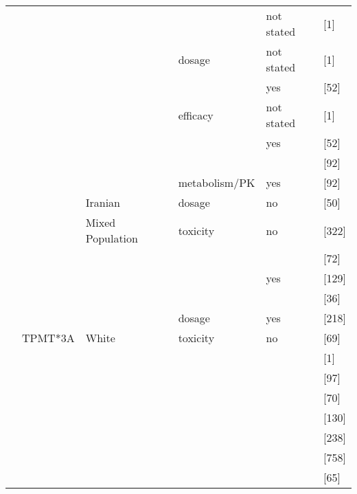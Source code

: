 \begin{center}
\begin{longtable}[H]{|l|l|l|l||l||l|}
\cline{5-6}
& & & & not stated & \citeauthor{pmid12477776} \citeyear{pmid12477776} [1] \\
\cline{4-6}
& & & dosage & not stated & \citeauthor{pmid12477776} \citeyear{pmid12477776} [1] \\
\cline{5-6}
& & & & yes & \citeauthor{Gardiner_2008} \citeyear{Gardiner_2008} [52] \\
\cline{4-6}
& & & efficacy & not stated & \citeauthor{pmid12477776} \citeyear{pmid12477776} [1] \\
\cline{5-6}
& & & & yes & \citeauthor{Gardiner_2008} \citeyear{Gardiner_2008} [52] \\
\cline{6-6}
& & & & & \citeauthor{pmid10734022} \citeyear{pmid10734022} [92] \\
\cline{4-6}
& & & metabolism/PK & yes & \citeauthor{pmid10734022} \citeyear{pmid10734022} [92] \\
\cline{3-6}
& & Iranian & dosage & no & \citeauthor{pmid21819368} \citeyear{pmid21819368} [50] \\
\cline{3-6}
& & Mixed Population & toxicity & no & \citeauthor{Newman_2011} \citeyear{Newman_2011} [322] \\
\cline{6-6}
& & & & & \citeauthor{RIDDER_2006} \citeyear{RIDDER_2006} [72] \\
\cline{5-6}
& & & & yes & \citeauthor{Heckmann_2005} \citeyear{Heckmann_2005} [129] \\
\cline{6-6}
& & & & & \citeauthor{Formea_2004} \citeyear{Formea_2004} [36] \\
\cline{4-6}
& & & dosage & yes & \citeauthor{Fabre_2004} \citeyear{Fabre_2004} [218] \\
\cline{2-6}
& TPMT*3A & White & toxicity & no & \citeauthor{pmid12172211} \citeyear{pmid12172211} [69] \\
\cline{6-6}
& & & & & \citeauthor{Yenson_2007} \citeyear{Yenson_2007} [1] \\
\cline{6-6}
& & & & & \citeauthor{Gazouli_2010} \citeyear{Gazouli_2010} [97] \\
\cline{6-6}
& & & & & \citeauthor{Stocco_2005} \citeyear{Stocco_2005} [70] \\
\cline{6-6}
& & & & & \citeauthor{WINTER_2007} \citeyear{WINTER_2007} [130] \\
\cline{6-6}
& & & & & \citeauthor{Moloney_2006} \citeyear{Moloney_2006} [238] \\
\cline{6-6}
& & & & & \citeauthor{pmid20593505} \citeyear{pmid20593505} [758] \\
\cline{6-6}
& & & & & \citeauthor{Breen_2005} \citeyear{Breen_2005} [65] \\

\end{longtable}
\end{center}
